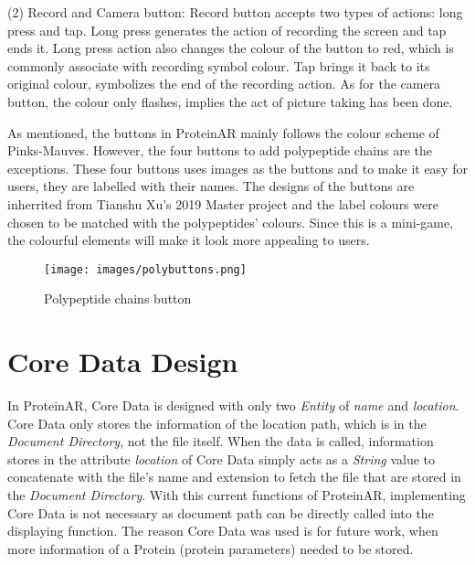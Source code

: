 (2) Record and Camera button: Record button accepts two types of actions: long press and tap. Long press generates the action of recording the screen and tap ends it. Long press action also changes the colour of the button to red, which is commonly associate with recording symbol colour. Tap brings it back to its original colour, symbolizes the end of the recording action. As for the camera button, the colour only flashes, implies the act of picture taking has been done. 

As mentioned, the buttons in ProteinAR mainly follows the colour scheme of Pinks-Mauves. However, the four buttons to add polypeptide chains are the exceptions. These four buttons uses images as the buttons and to make it easy for users, they are labelled with their names. The designs of the buttons are   inherrited from Tianshu Xu’s 2019 Master project \parencite{xu_interactive_2019} and the label colours were chosen to be matched with the polypeptides’ colours. Since this is a mini-game, the colourful elements will make it look more appealing to users. 
\begin{figure}[hbt!]
	\centering
	\texttt{[image: images/polybuttons.png]}
	\caption{Polypeptide chains button}
	\label{fig:polybuttons}
\end{figure}

\section{Core Data Design}
In ProteinAR, Core Data is designed with only two \emph{Entity} of \emph{name} and \emph{location}. Core Data only stores the information of the location path, which is in the \emph{Document Directory}, not the file itself. When the data is called, information stores in the attribute \emph{location} of Core Data simply acts as a \emph{String} value to concatenate with the file's name and extension to fetch the file that are stored in the \emph{Document Directory}. 
With this current functions of ProteinAR, implementing Core Data is not necessary as document path can be directly called into the displaying function. The reason Core Data was used is for future work, when more information of a Protein (protein parameters) needed to be stored. 




